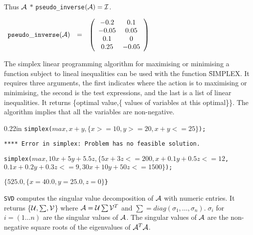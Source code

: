 Thus ${\cal A}$ $ * $ {\tt pseudo\_inverse}$({\cal A}) = {\cal I}$.

\begin{flushleft}  
\hspace*{0.1in}
\begin{math}  
\begin{array}{ccc}
{\tt pseudo\_inverse}({\cal A}) & = & 
        \left( \begin{array}{cc} -0.2 & 0.1 \\ -0.05 & 0.05 \\ 0.1 & 0 
\\ 0.25 & -0.05 
 \end{array} \right) 
\end{array}
\end{math}  
\end{flushleft}

\label{simplex}
The simplex linear programming algorithm for
maximising or minimising a function subject to lineal inequalities can
be used with the function \f{SIMPLEX}.  It requires
three arguments, the first indicates where the action is to maximising
or minimising, the second is the test expressions, and the last is a
list of linear inequalities.
It returns \{optimal value,\{ values of variables at this optimal\}\}.
The algorithm implies that all the variables are non-negative.

\begin{addtolength}{\leftskip}{0.22in}
{\tt simplex($max,x+y,\{x>=10,y>=20,x+y<=25\}$);}

{\tt ***** Error in simplex: Problem has no feasible solution.}

\vspace*{0.2in}

\parbox[t]{0.96\linewidth}{\tt simplex($max,10x+5y+5.5z,\{5x+3z<=200,
x+0.1y+0.5z<=12$,\\
\hspace*{0.55in} $0.1x+0.2y+0.3z<=9, 30x+10y+50z<=1500\}$);}

\vspace*{0.1in}
{\tt $\{525.0,\{x=40.0,y=25.0,z=0\}$\}}

\end{addtolength}

{\tt SVD} computes the singular value decomposition of
${\cal A}$ with numeric entries.   It returns \{${\cal U},\sum,{\cal V}$\} where ${\cal A} = {\cal U} 
\sum {\cal V}^T$ and $\sum = diag(\sigma_{1}, \ldots ,\sigma_{n}). \; 
\sigma_{i}$ for $i= (1 \ldots n)$ are the singular values of ${\cal A}$.
The singular values of ${\cal A}$ are the non-negative square roots of 
the eigenvalues of ${\cal A}^T {\cal A}$. 

